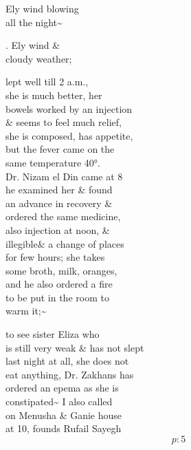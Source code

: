 \documentclass{report}
\begin{document}
	\par{
 	Ely wind blowing\ \\all the night\~{}\ \\
	}


	\par{
 	. Ely wind \&\ \\cloudy weather;\ \\
	}

	\par{
 	lept well till 2 a.m.,\ \\she is much better, her\ \\bowels worked by an injection\ \\\& seems to feel much relief,\ \\she is composed, has appetite,\ \\but the fever came on the\ \\same temperature 40°.\ \\Dr. Nizam el Din came at 8\ \\he examined her \& found\ \\an advance in recovery \&\ \\ordered the same medicine,\ \\also injection at noon, \&\ \\\lbrack illegible\rbrack \& a change of places\ \\for few hours; she takes\ \\some broth, milk, oranges,\ \\and he also ordered a fire\ \\to be put in the room to\ \\warm it;\~{}\ \\
	}

	\par{
 	to see sister Eliza who\ \\is still very weak \& has not slept\ \\last night at all, she does not\ \\eat anything, Dr. Zakhans has\ \\ordered an epema as she is\ \\constipated\~{} I also called\ \\on Menusha \& Ganie house\ \\at 10, founds Rufail Sayegh\ \\
  \[p: 5 \]

	}

\end{document}
